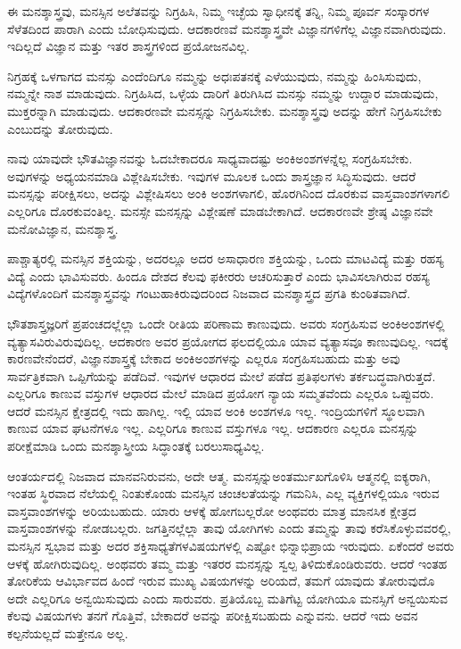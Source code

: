 ಈ ಮನಶ್ಶಾಸ್ತ್ರವು, ಮನಸ್ಸಿನ ಅಲೆತವನ್ನು ನಿಗ್ರಹಿಸಿ, ನಿಮ್ಮ ಇಚ್ಛೆಯ ಸ್ವಾಧೀನಕ್ಕೆ ತನ್ನಿ, ನಿಮ್ಮ ಪೂರ್ವ ಸಂಸ್ಕಾರಗಳ ಸೆಳೆತದಿಂದ ಪಾರಾಗಿ ಎಂದು ಬೋಧಿಸುವುದು. ಆದಕಾರಣವೆ ಮನಶ್ಶಾಸ್ತ್ರವೇ ವಿಜ್ಞಾನಗಳಿಗೆಲ್ಲ ವಿಜ್ಞಾನವಾಗಿರುವುದು. ಇದಿಲ್ಲದೆ ವಿಜ್ಞಾನ ಮತ್ತು ಇತರ ಶಾಸ್ತ್ರಗಳಿಂದ ಪ್ರಯೋಜನವಿಲ್ಲ.

ನಿಗ್ರಹಕ್ಕೆ ಒಳಗಾಗದ ಮನಸ್ಸು ಎಂದೆಂದಿಗೂ ನಮ್ಮನ್ನು ಅಧಃಪತನಕ್ಕೆ ಎಳೆಯುವುದು, ನಮ್ಮನ್ನು ಹಿಂಸಿಸುವುದು, ನಮ್ಮನ್ನೇ ನಾಶ ಮಾಡುವುದು. ನಿಗ್ರಹಿಸಿದ, ಒಳ್ಳೆಯ ದಾರಿಗೆ ತಿರುಗಿಸಿದ ಮನಸ್ಸು ನಮ್ಮನ್ನು ಉದ್ದಾರ ಮಾಡುವುದು, ಮುಕ್ತರನ್ನಾಗಿ ಮಾಡುವುದು. ಆದಕಾರಣವೇ ಮನಸ್ಸನ್ನು ನಿಗ್ರಹಿಸಬೇಕು. ಮನಶ್ಶಾಸ್ತ್ರವು ಅದನ್ನು ಹೇಗೆ ನಿಗ್ರಹಿಸಬೇಕು ಎಂಬುದನ್ನು ತೋರುವುದು.

ನಾವು ಯಾವುದೇ ಭೌತವಿಜ್ಞಾನವನ್ನು ಓದಬೇಕಾದರೂ ಸಾಧ್ಯವಾದಷ್ಟು ಅಂಕಿಅಂಶಗಳನ್ನೆಲ್ಲ ಸಂಗ್ರಹಿಸಬೇಕು. ಅವುಗಳನ್ನು ಅಧ್ಯಯನಮಾಡಿ ವಿಶ್ಲೇಷಿಸಬೇಕು. ಇವುಗಳ ಮೂಲಕ ಒಂದು ಶಾಸ್ತ್ರಜ್ಞಾನ ಸಿದ್ಧಿಸುವುದು. ಆದರೆ ಮನಸ್ಸನ್ನು ಪರೀಕ್ಷಿಸಲು, ಅದನ್ನು ವಿಶ್ಲೇಷಿಸಲು ಅಂಕಿ ಅಂಶಗಳಾಗಲಿ, ಹೊರಗಿನಿಂದ ದೊರಕುವ ವಾಸ್ತವಾಂಶಗಳಾಗಲಿ ಎಲ್ಲರಿಗೂ ದೊರಕುವಂತಿಲ್ಲ. ಮನಸ್ಸೇ ಮನಸ್ಸನ್ನು ವಿಶ್ಲೇಷಣೆ ಮಾಡಬೇಕಾಗಿದೆ. ಆದಕಾರಣವೇ ಶ್ರೇಷ್ಠ ವಿಜ್ಞಾನವೇ ಮನೋವಿಜ್ಞಾನ, ಮನಶ್ಶಾಸ್ತ್ರ.

ಪಾಶ್ಚಾತ್ಯರಲ್ಲಿ ಮನಸ್ಸಿನ ಶಕ್ತಿಯನ್ನು, ಅದರಲ್ಲೂ ಅದರ ಅಸಾಧಾರಣ ಶಕ್ತಿಯನ್ನು, ಒಂದು ಮಾಟವಿದ್ಯೆ ಮತ್ತು ರಹಸ್ಯ ವಿದ್ಯೆ ಎಂದು ಭಾವಿಸುವರು. ಹಿಂದೂ ದೇಶದ ಕೆಲವು ಫಕೀರರು ಆಚರಿಸುತ್ತಾರೆ ಎಂದು ಭಾವಿಸಲಾಗಿರುವ ರಹಸ್ಯ ವಿದ್ಯೆಗಳೊಂದಿಗೆ ಮನಶ್ಶಾಸ್ತ್ರವನ್ನು ಗಂಟುಹಾಕಿರುವುದರಿಂದ ನಿಜವಾದ ಮನಶ್ಶಾಸ್ತ್ರದ ಪ್ರಗತಿ ಕುಂಠಿತವಾಗಿದೆ.

ಭೌತಶಾಸ್ತ್ರಜ್ಞರಿಗೆ ಪ್ರಪಂಚದಲ್ಲೆಲ್ಲಾ ಒಂದೇ ರೀತಿಯ ಪರಿಣಾಮ ಕಾಣುವುದು. ಅವರು ಸಂಗ್ರಹಿಸುವ ಅಂಕಿಅಂಶಗಳಲ್ಲಿ ವ್ಯತ್ಯಾಸವಿರುವಿರುವುದಿಲ್ಲ. ಆದಕಾರಣ ಅವರ ಪ್ರಯೋಗದ ಫಲದಲ್ಲಿಯೂ ಯಾವ ವ್ಯತ್ಯಾಸವೂ ಕಾಣುವುದಿಲ್ಲ. ಇದಕ್ಕೆ ಕಾರಣವೇನೆಂದರೆ, ವಿಜ್ಞಾನಶಾಸ್ತ್ರಕ್ಕೆ ಬೇಕಾದ ಅಂಕಿಅಂಶಗಳನ್ನು ಎಲ್ಲರೂ ಸಂಗ್ರಹಿಸಬಹುದು ಮತ್ತು ಅವು ಸಾರ್ವತ್ರಿಕವಾಗಿ ಒಪ್ಪಿಗೆಯನ್ನು ಪಡೆದಿವೆ. ಇವುಗಳ ಆಧಾರದ ಮೇಲೆ ಪಡೆದ ಪ್ರತಿಫಲಗಳು ತರ್ಕಬದ್ಧವಾಗಿರುತ್ತದೆ. ಎಲ್ಲರಿಗೂ ಕಾಣುವ ವಸ್ತುಗಳ ಆಧಾರದ ಮೇಲೆ ಮಾಡಿದ ಪ್ರಯೋಗ ನ್ಯಾಯ ಸಮ್ಮತವೆಂದು ಎಲ್ಲರೂ ಒಪ್ಪುವರು. ಆದರೆ ಮನಸ್ಸಿನ ಕ್ಷೇತ್ರದಲ್ಲಿ ಇದು ಹಾಗಿಲ್ಲ. ಇಲ್ಲಿ ಯಾವ ಅಂಕಿ ಅಂಶಗಳೂ ಇಲ್ಲ. ಇಂದ್ರಿಯಗಳಿಗೆ ಸ್ಥೂಲವಾಗಿ ಕಾಣುವ ಯಾವ ಘಟನೆಗಳೂ ಇಲ್ಲ. ಎಲ್ಲರಿಗೂ ಕಾಣುವ ವಸ್ತುಗಳೂ ಇಲ್ಲ. ಆದಕಾರಣ ಎಲ್ಲರೂ ಮನಸ್ಸನ್ನು ಪರೀಕ್ಷೆಮಾಡಿ ಒಂದು ಮನಶ್ಶಾಸ್ತ್ರೀಯ ಸಿದ್ಧಾಂತಕ್ಕೆ ಬರಲು\break ಸಾಧ್ಯವಿಲ್ಲ.

ಆಂತರ್ಯದಲ್ಲಿ ನಿಜವಾದ ಮಾನವನಿರುವನು, ಅದೇ ಆತ್ಮ. ಮನಸ್ಸನ್ನು\break ಅಂತರ್ಮುಖಗೊಳಿಸಿ ಆತ್ಮನಲ್ಲಿ ಐಕ್ಯರಾಗಿ, ಇಂತಹ ಸ್ಥಿರವಾದ ನೆಲೆಯಲ್ಲಿ ನಿಂತುಕೊಂಡು ಮನಸ್ಸಿನ ಚಂಚಲತೆಯನ್ನು ಗಮನಿಸಿ, ಎಲ್ಲ ವ್ಯಕ್ತಿಗಳಲ್ಲಿಯೂ ಇರುವ ವಾಸ್ತವಾಂಶಗಳನ್ನು ಅರಿಯಬಹುದು. ಯಾರು ಆಳಕ್ಕೆ ಹೋಗಬಲ್ಲರೋ ಅಂಥವರು ಮಾತ್ರ ಮಾನಸಿಕ ಕ್ಷೇತ್ರದ ವಾಸ್ತವಾಂಶಗಳನ್ನು ನೋಡಬಲ್ಲರು. ಜಗತ್ತಿನಲ್ಲೆಲ್ಲಾ ತಾವು ಯೋಗಿಗಳು ಎಂದು ತಮ್ಮನ್ನು ತಾವು ಕರೆಸಿಕೊಳ್ಳುವವರಲ್ಲಿ, ಮನಸ್ಸಿನ ಸ್ವಭಾವ ಮತ್ತು ಅದರ ಶಕ್ತಿಸಾಧ್ಯತೆಗಳ\break ವಿಷಯಗಳಲ್ಲಿ ಎಷ್ಟೋ ಭಿನ್ನಾಭಿಪ್ರಾಯ ಇರುವುದು. ಏಕೆಂದರೆ ಅವರು ಆಳಕ್ಕೆ ಹೋಗಿರುವುದಿಲ್ಲ. ಅಂಥವರು ತಮ್ಮ ಮತ್ತು ಇತರರ ಮನಸ್ಸನ್ನು ಸ್ವಲ್ಪ ತಿಳಿದುಕೊಂಡಿರುವರು. ಆದರೆ ಇಂತಹ ತೋರಿಕೆಯ ಆವಿರ್ಭಾವದ ಹಿಂದೆ ಇರುವ ಮುಖ್ಯ ವಿಷಯಗಳನ್ನು ಅರಿಯದೆ, ತಮಗೆ ಯಾವುದು ತೋರುವುದೊ ಅದೇ ಎಲ್ಲರಿಗೂ ಅನ್ವಯಿಸುವುದು ಎಂದು ಸಾರುವರು. ಪ್ರತಿಯೊಬ್ಬ ಮತಿಗೆಟ್ಟ ಯೋಗಿಯೂ ಮನಸ್ಸಿಗೆ ಅನ್ವಯಿಸುವ ಕೆಲವು ವಿಷಯಗಳು ತನಗೆ ಗೊತ್ತಿವೆ, ಬೇಕಾದರೆ ಅವನ್ನು ಪರೀಕ್ಷಿಸಬಹುದು ಎನ್ನುವನು. ಆದರೆ ಇದು ಅವನ ಕಲ್ಪನೆಯಲ್ಲದೆ ಮತ್ತೇನೂ ಅಲ್ಲ.


